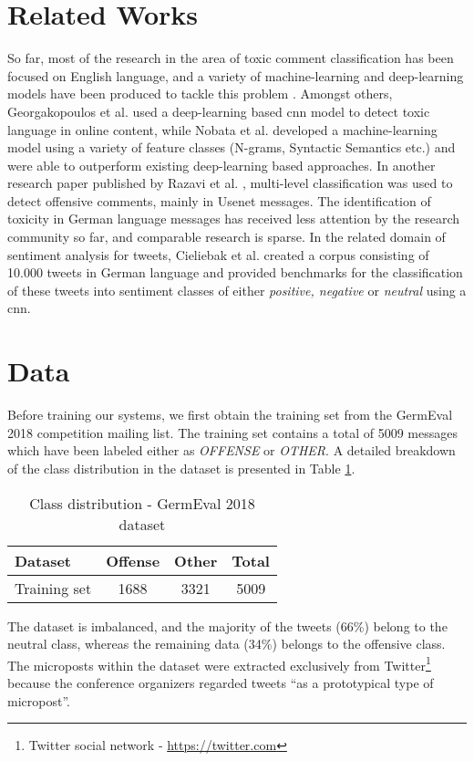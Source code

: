 \documentclass[11pt]{article}
\begin{document}
\section{Related Works}
So far, most of the research in the area of toxic comment classification has been focused on English language, and a variety of machine-learning and deep-learning models have been produced to tackle this problem \cite{RN56}.  Amongst others, Georgakopoulos et al.  used a deep-learning based \ac{cnn} model to detect toxic language in online content, while Nobata et al.  developed a machine-learning model using a variety of feature classes (N-grams, Syntactic Semantics etc.) and were able to outperform existing deep-learning based approaches. In another research paper published by Razavi et al. , multi-level classification was used to detect offensive comments, mainly in Usenet messages. 
\newline
The identification of toxicity in German language messages has received less attention by the research community so far, and comparable research is sparse. In the related domain of sentiment analysis for tweets, Cieliebak et al.  created a corpus consisting of 10.000 tweets in German language and provided benchmarks for the classification of these tweets into sentiment classes of either \textit{positive, negative} or \textit{neutral} using a \ac{cnn}.   

\section{Data}
\label{sec:data}
Before training our systems, we first obtain the training set from the GermEval 2018 competition mailing list. The training set contains a total of 5009 messages which have been labeled either as \textit{OFFENSE} or \textit{OTHER}. A detailed breakdown of the class distribution in the dataset is presented in Table \ref{tbl:dataset}.
\begin{table}[h]
\begin{center}
\begin{tabular}{l c c c }
\toprule \bf Dataset &  Offense &  Other &  Total \\ \midrule
Training set & 1688 & 3321 & 5009 \\
\bottomrule
\end{tabular}
\end{center}
\caption{\label{tbl:dataset} Class distribution - GermEval 2018 dataset}
\end{table}
\newline
The dataset is imbalanced, and the majority of the tweets (66\%) belong to the neutral class, whereas the remaining data (34\%) belongs to the offensive class. The microposts within the dataset were extracted exclusively from Twitter\footnote{Twitter social network - \url{https://twitter.com}} because the conference organizers regarded tweets \enquote{as a prototypical type of micropost}\footnotemark[2].
\end{document}

